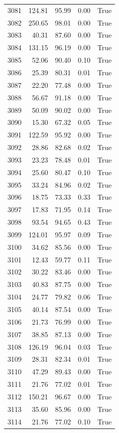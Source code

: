 \begin{longtable}{rrrrr}
3081 & 124.81 & 95.99 & 0.00 & True \\
3082 & 250.65 & 98.01 & 0.00 & True \\
3083 & 40.31 & 87.60 & 0.00 & True \\
3084 & 131.15 & 96.19 & 0.00 & True \\
3085 & 52.06 & 90.40 & 0.10 & True \\
3086 & 25.39 & 80.31 & 0.01 & True \\
3087 & 22.20 & 77.48 & 0.00 & True \\
3088 & 56.67 & 91.18 & 0.00 & True \\
3089 & 50.09 & 90.02 & 0.00 & True \\
3090 & 15.30 & 67.32 & 0.05 & True \\
3091 & 122.59 & 95.92 & 0.00 & True \\
3092 & 28.86 & 82.68 & 0.02 & True \\
3093 & 23.23 & 78.48 & 0.01 & True \\
3094 & 25.60 & 80.47 & 0.10 & True \\
3095 & 33.24 & 84.96 & 0.02 & True \\
3096 & 18.75 & 73.33 & 0.33 & True \\
3097 & 17.83 & 71.95 & 0.14 & True \\
3098 & 93.54 & 94.65 & 0.43 & True \\
3099 & 124.01 & 95.97 & 0.09 & True \\
3100 & 34.62 & 85.56 & 0.00 & True \\
3101 & 12.43 & 59.77 & 0.11 & True \\
3102 & 30.22 & 83.46 & 0.00 & True \\
3103 & 40.83 & 87.75 & 0.00 & True \\
3104 & 24.77 & 79.82 & 0.06 & True \\
3105 & 40.14 & 87.54 & 0.00 & True \\
3106 & 21.73 & 76.99 & 0.00 & True \\
3107 & 38.85 & 87.13 & 0.00 & True \\
3108 & 126.19 & 96.04 & 0.03 & True \\
3109 & 28.31 & 82.34 & 0.01 & True \\
3110 & 47.29 & 89.43 & 0.00 & True \\
3111 & 21.76 & 77.02 & 0.01 & True \\
3112 & 150.21 & 96.67 & 0.00 & True \\
3113 & 35.60 & 85.96 & 0.00 & True \\
3114 & 21.76 & 77.02 & 0.10 & True \\

\end{longtable}

